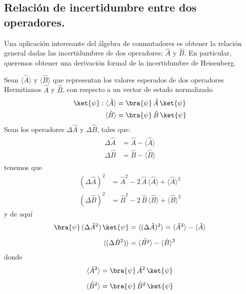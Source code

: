 \subsection{Relación de incertidumbre entre dos operadores.}
Una aplicación interesante del álgebra de conmutadores es obtener la relación general dadas las incertidumbres de dos operadores: $\hat{A}$ y $\hat{B}$. En particular, queremos obtener una derivación formal de la incertidumbre de Heisenberg.
\par
Sean $\langle \hat{A} \rangle$ y $ \langle \hat{B} \rangle$ que representan los valores esperados de dos operadores Hermitianos $\hat{A}$ y $\hat{B}$, con respecto a un vector de estado normalizado 
\begin{align*}
\ket{\psi}: \langle \hat{A} \rangle &= \bra{\psi} \, \hat{A} \, \ket{\psi} \\
\langle \hat{B} \rangle &= \bra{\psi} \, \hat{B} \, \ket{\psi}
\end{align*}
Sean los operadores $\Delta \hat{A}$ y $\Delta \hat{B}$, tales que:
\begin{align}
\begin{aligned}
\Delta \hat{A} &= \hat{A} - \langle \hat{A} \rangle \\
\Delta \hat{B} &= \hat{B} - \langle \hat{B} \rangle
\end{aligned}
\label{eq:ecuacion_02_95}
\end{align}
tenemos que
\begin{align*}
(\Delta \hat{A})^{2} &= \hat{A}^{2} - 2 \, \hat{A} \, \langle \hat{A} \rangle + \langle \hat{A} \rangle^{2} \\
(\Delta \hat{B})^{2} &= \hat{B}^{2} - 2 \, \hat{B} \, \langle \hat{B} \rangle + \langle \hat{B} \rangle^{2}
\end{align*}
y de aquí
\begin{align}
\begin{aligned}
\bra{\psi} \, (\Delta \hat{A}^{2}) \, \ket{\psi} &= \langle (\Delta \hat{A})^{2} \rangle = \langle \hat{A}^{2} \rangle - \langle \hat{A} \rangle \\[0.5em]
\langle (\Delta \hat{B}^{2}) \rangle &= \langle \hat{B^{2}} \rangle - \langle \hat{B} \rangle^{2}
\end{aligned}
\label{eq:ecuacion_02_96}
\end{align}
donde
\begin{align*}
\langle \hat{A}^{2} \rangle &= \bra{\psi} \, \hat{A}^{2} \, \ket{\psi} \\[0.5em]
\langle \hat{B}^{2} \rangle &= \bra{\psi} \, \hat{B}^{2} \, \ket{\psi}
\end{align*}
